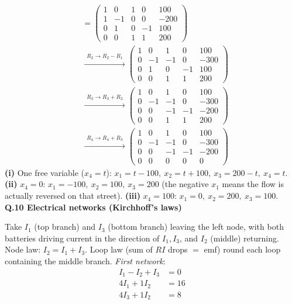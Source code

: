 \begin{align*}
[A|b] &= \left(\begin{array}{cccc|c}1 & 0 & 1 & 0 & 100 \\ 1 & -1 & 0 & 0 & -200 \\ 0 & 1 & 0 & -1 & 100 \\ 0 & 0 & 1 & 1 & 200\end{array}\right) \\
&\xrightarrow{\substack{R_2\to R_2-R_1}} \left(\begin{array}{cccc|c}1 & 0 & 1 & 0 & 100 \\ 0 & -1 & -1 & 0 & -300 \\ 0 & 1 & 0 & -1 & 100 \\ 0 & 0 & 1 & 1 & 200\end{array}\right) \\
&\xrightarrow{\substack{R_3\to R_3+R_2}} \left(\begin{array}{cccc|c}1 & 0 & 1 & 0 & 100 \\ 0 & -1 & -1 & 0 & -300 \\ 0 & 0 & -1 & -1 & -200 \\ 0 & 0 & 1 & 1 & 200\end{array}\right) \\
&\xrightarrow{\substack{R_4\to R_4+R_3}} \left(\begin{array}{cccc|c}1 & 0 & 1 & 0 & 100 \\ 0 & -1 & -1 & 0 & -300 \\ 0 & 0 & -1 & -1 & -200 \\ 0 & 0 & 0 & 0 & 0\end{array}\right)
\end{align*}
\textbf{(i)} One free variable ($x_4=t$): $x_1=t-100,\ x_2=t+100,\ x_3=200-t,\ x_4=t$.
\textbf{(ii)} $x_4=0$: $x_1=-100,\ x_2=100,\ x_3=200$ (the negative $x_1$ means the flow is actually reversed on that street).
\textbf{(iii)} $x_4=100$: $x_1=0,\ x_2=200,\ x_3=100$.
\medskip\noindent\textbf{Q.10  Electrical networks (Kirchhoff's laws)}\par\smallskip
Take $I_1$ (top branch) and $I_3$ (bottom branch) leaving the left node, with both batteries driving current in the direction of $I_1,I_3$, and $I_2$ (middle) returning. Node law: $I_2=I_1+I_3$. Loop law (sum of $RI$ drops $=$ emf) round each loop containing the middle branch.
\noindent\emph{First network}: \begin{align*}
I_1-I_2+I_3&=0 \\
4I_1+1I_2&=16 \\
4I_3+1I_2&=8
\end{align*}
